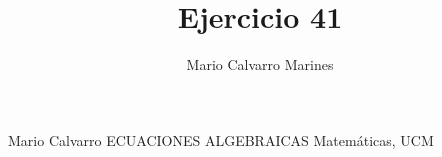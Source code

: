 \documentclass[10pt,a4paper,openright]{book}
\title{Ejercicio 41}
\author{Mario Calvarro Marines}
\date{}
\begin{document}
\mainmatter
\noindent Mario Calvarro \hfill {\Large ECUACIONES ALGEBRAICAS} \hfill Matemáticas, UCM

\end{document}
